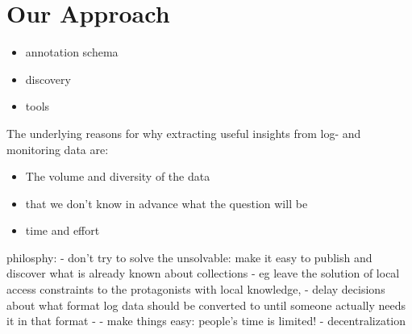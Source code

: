 \section{Our Approach}
\label{s:solution}

\begin{itemize}
\item annotation schema
\item discovery
\item tools
\end{itemize}

The underlying reasons for why extracting useful insights from log- and 
monitoring data are:
\begin{itemize}
\item The volume and diversity of the data
\item that we don't know in advance what the question will be 
\item time and effort
\end{itemize}

philosphy:
 - don't try to solve the unsolvable: make it easy to publish and discover 
   what is already known about collections
       - eg leave the solution of local access constraints to 
   the protagonists with local knowledge, 
       - delay decisions about what format 
   log data should be converted to until someone actually needs it in that format
        - 
 - make things easy: people's time is limited!
 - decentralization
 
 
 
